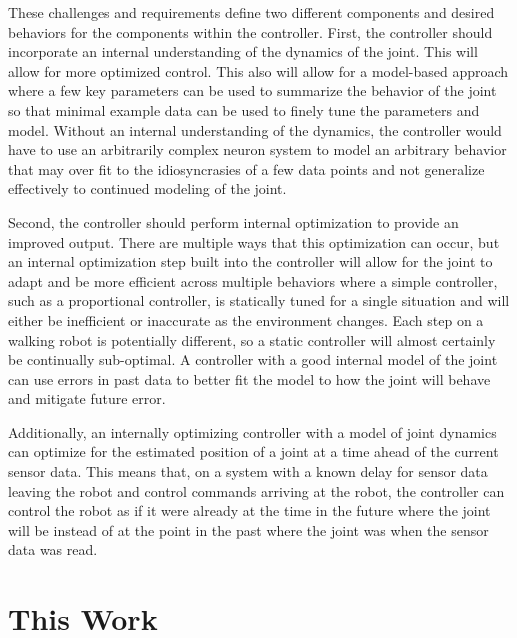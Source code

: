 These challenges and requirements define two different components and desired
behaviors for the components within the controller. First, the controller should
incorporate an internal understanding of the dynamics of the joint. This will
allow for more optimized control. This also will allow for a model-based
approach where a few key parameters can be used to summarize the behavior of the
joint so that minimal example data can be used to finely tune the parameters and
model. Without an internal understanding of the dynamics, the controller would have to
use an arbitrarily complex neuron system to model an arbitrary behavior that may
over fit to the idiosyncrasies of a few data points and not generalize
effectively to continued modeling of the joint.

Second, the controller should perform internal optimization to provide an
improved output. There are multiple ways that this optimization can occur, but
an internal optimization step built into the controller will allow for the joint
to adapt and be more efficient across multiple behaviors where a simple
controller, such as a proportional controller, is statically tuned for a single
situation and will either be inefficient or inaccurate as the environment
changes. Each step on a walking robot is potentially different, so a static
controller will almost certainly be continually sub-optimal. A controller with a good internal model of the joint can use errors in past data to better fit the model to how the joint will behave and mitigate future error.

Additionally, an internally optimizing controller with a model of joint dynamics can
optimize for the estimated position of a joint at a time ahead of the current
sensor data. This means that, on a system with a known delay for sensor data
leaving the robot and control commands arriving at the robot, the controller can
control the robot as if it were already at the time in the future where the
joint will be instead of at the point in the past where the joint was when the
sensor data was read.

\section{This Work}

